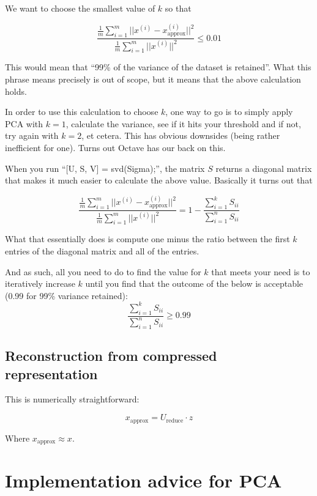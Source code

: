 We want to choose the smallest value of $k$ so that

\begin{equation}
\frac{
\frac{1}{m}\sum^m_{i = 1}||x^{(i)} - x^{(i)}_{\textrm{approx}}||^2
}{
\frac{1}{m}\sum^m_{i = 1}||x^{(i)}||^2
}
\leq
0.01
\end{equation}

This would mean that ``99\% of the variance of the dataset is retained''. What this phrase means precisely is out of scope, but it means that the above calculation holds.

In order to use this calculation to choose $k$, one way to go is to simply apply PCA with $k = 1$, calculate the variance, see if it hits your threshold and if not, try again with $k = 2$, et cetera. This has obvious downsides (being rather inefficient for one). Turns out Octave has our back on this.

When you run ``[U, S, V] = svd(Sigma);'', the matrix $S$ returns a diagonal matrix that makes it much easier to calculate the above value. Basically it turns out that

\begin{equation}
\frac{
\frac{1}{m}\sum^m_{i = 1}||x^{(i)} - x^{(i)}_{\textrm{approx}}||^2
}{
\frac{1}{m}\sum^m_{i = 1}||x^{(i)}||^2
}
=
1 - \frac{\sum^k_{i = 1}S_{ii}}{\sum^n_{i = 1}S_{ii}}
\end{equation}

What that essentially does is compute one minus the ratio between the first $k$ entries of the diagonal matrix and all of the entries.

And as such, all you need to do to find the value for $k$ that meets your need is to iteratively increase $k$ until you find that the outcome of the below is acceptable (0.99 for 99\% variance retained):
\[
\frac{\sum^k_{i = 1}S_{ii}}{\sum^n_{i = 1}S_{ii}} \geq 0.99
\]

\subsection{Reconstruction from compressed representation}

This is numerically straightforward:

\[
x_{\textrm{approx}} = U_{\textrm{reduce}} \cdot z
\]

Where $x_{\textrm{approx}} \approx x$.

\section{Implementation advice for PCA}

